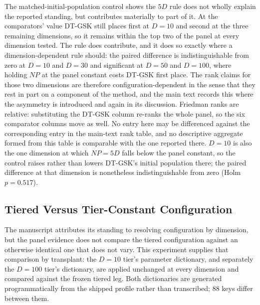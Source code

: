 \documentclass[algorithms,article,submit,moreauthors,pdftex]{Definitions/mdpi}
\newcommand{\dtgsk}{DT-GSK}
\begin{document}
The matched-initial-population control shows the $5D$ rule does not wholly
explain the reported standing, but contributes materially to part of it.  At the
comparators' value \dtgsk{} still places first at $D = 10$ and second at the
three remaining dimensions, so it remains within the top two of the panel at
every dimension tested.  The rule does contribute, and it does so exactly where
a dimension-dependent rule should: the paired difference is indistinguishable
from zero at $D = 10$ and $D = 30$ and significant at $D = 50$ and $D = 100$,
where holding $NP$ at the panel constant costs \dtgsk{} first place.  The rank
claims for those two dimensions are therefore configuration-dependent in the
sense that they rest in part on a component of the method, and the main text
records this where the asymmetry is introduced and again in its discussion.
  Friedman ranks are relative:
substituting the \dtgsk{} column re-ranks the whole panel, so the six
comparator columns move as well.  No entry here may be differenced against the
corresponding entry in the main-text rank table, and no descriptive aggregate
formed from this table is comparable with the one reported there.  $D = 10$ is
also the one dimension at which $NP = 5D$ falls below the panel constant, so
the control raises rather than lowers \dtgsk{}'s initial population there; the
paired difference at that dimension is nonetheless indistinguishable from zero
(Holm $p = 0.517$).

\subsection{Tiered Versus Tier-Constant Configuration}\label{sec:supp:rev:tiering}

The manuscript attributes its standing to resolving configuration by dimension,
but the panel evidence does not compare the tiered configuration against an
otherwise identical one that does not vary.  This experiment supplies that
comparison by transplant: the $D = 10$ tier's parameter dictionary, and separately
the $D = 100$ tier's dictionary, are applied unchanged at every dimension and
compared against the frozen tiered leg.  Both dictionaries are generated
programmatically from the shipped profile rather than transcribed; 88 keys
differ between them.
\end{document}
